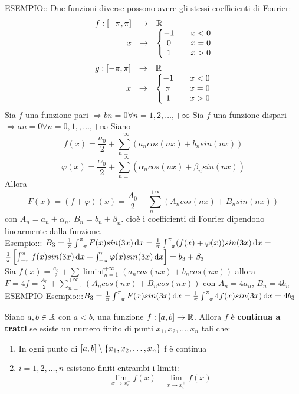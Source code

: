 ESEMPIO:: Due funzioni diverse possono avere gli stessi coefficienti di Fourier:
\[\begin{array}{rcl} f: \left[-\pi,\pi\right] & \to &  \mathbb{R} \\
x & \to & \left\{\begin{matrix} -1 && x<0\\0&&x= 0\\1&&x>0 \end{matrix}\right.\end{array}\]
\[\begin{array}{rcl} g: \left[-\pi,\pi\right] & \to &  \mathbb{R} \\
x & \to & \left\{\begin{matrix} -1 && x<0\\\pi&&x= 0\\1&&x>0 \end{matrix}\right.\end{array}\]
\observation
Sia $f$ una funzione pari $\Rightarrow bn=0 \forall n=1,2,\dotsc,+\infty$
\observation
Sia $f$ una funzione dispari $\Rightarrow an=0 \forall n=0,1,,\dotsc,+\infty$
\observation
Siano
\[f(x)=\frac{a_0}{2}+\sum\limits_{n=}^{+\infty}\left(a_ncos(nx)+b_nsin(nx)\right)\]
\[\varphi(x)=\frac{\alpha_0}{2}+\sum\limits_{n=}^{+\infty}\left(\alpha_ncos(nx)+\beta_nsin(nx)\right)\]
Allora
\[ F(x)=(f+\varphi)(x)=\frac{A_0}{2}+\sum\limits_{n=}^{+\infty}\left(A_ncos(nx)+B_nsin(nx)\right)\]
con $A_n=a_n+\alpha_n$. $B_n=b_n+\beta_n$.
cioè i coefficienti di Fourier dipendono linearmente dalla funzione.\\
Esempio::: $B_3=\frac{1}{\pi}\int_{-\pi}^{\pi}F(x)sin(3x)\,\mathrm{d}{x}=\frac{1}{\pi}\int_{-\pi}^{\pi}(f(x)+\varphi(x))sin(3x)\,\mathrm{d}{x}=$\\
$\frac{1}{\pi}\left[\int_{-\pi}^{\pi}f(x)sin(3x)\,\mathrm{d}{x}+\int_{-\pi}^{\pi}\varphi(x)sin(3x)\,\mathrm{d}{x}\right]=b_3+\beta_3$\\
Sia $f(x)=\frac{a_0}{2}+\sum\liminf_{n=1}^{+\infty}\left(a_ncos(nx)+b_ncos(nx)\right)$ allora $F=4f=\frac{A_0}{2}+\sum\limits_{n=1}^{+\infty}\left(A_ncos(nx)+B_ncos(nx)\right)$ con $A_n=4a_n$, $B_n=4b_n$\\
ESEMPIO
Esempio:::$B_3=\frac{1}{\pi}\int_{-\pi}^{\pi}F(x)sin(3x)\,\mathrm{d}{x}=\frac{1}{\pi}\int_{-\pi}^{\pi}4f(x)sin(3x)\,\mathrm{d}{x}=4b_3$\\
\begin{definition}
	Siano $a,b\in \mathbb{R}$ con $a<b$, una funzione $f:\left[a,b\right] \to \mathbb{R}$. Allora $f$ è \textbf{continua a tratti} se esiste un numero finito di punti $x_1,x_2,\dotsc,x_n$ tali che:
	\begin{enumerate}
		\item In ogni punto di $\left[a,b\right]\setminus\left\{x_1,x_2,\dotsc,x_n\right\}$ f è continua
		\item $i=1,2,\dotsc,n$ esistono finiti entrambi i limiti:
		\[\lim\limits_{x\to x_i^{-}}f(x)\quad \lim\limits_{x\to x_i^{+}}f(x)\]
	\end{enumerate}
\end{definition}

